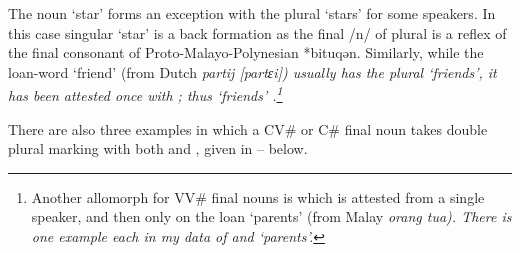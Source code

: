 \begin{exe}
	\label{ex:pl->=n/VVnoun}
\end{exe}

The noun  `star' forms an exception with
the plural  `stars' for some speakers.
In this case singular  `star' is a back formation
as the final /n/ of plural  is a reflex
of the final consonant of Proto-Malayo-Polynesian *bituqən.
Similarly, while the loan-word  `friend'
(from Dutch \it{partij} [partɛi]) usually has the plural
 `friends', it has been attested once
with ; thus  `friends' \citep[3]{or16}.\footnote{
		Another allomorph for VV{\#} final nouns
		is  which is attested
		from a single speaker, and then only on the loan  `parents'
		(from Malay \it{orang tua}).
		There is one example each in my data of 
		and  `parents'.}

There are also three examples in which
a CV{\#} or C{\#} final noun takes double plural marking
with both  and ,
given in -- below.

